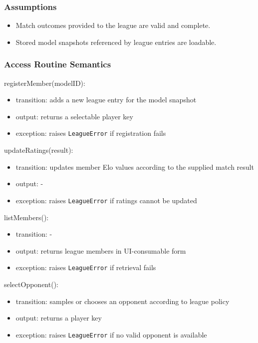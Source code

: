 \documentclass[12pt, titlepage]{article}
\begin{document}
\subsubsection{Assumptions}
\begin{itemize}
    \item Match outcomes provided to the league are valid and complete.
    \item Stored model snapshots referenced by league entries are loadable.
\end{itemize}

\subsubsection{Access Routine Semantics}

\noindent registerMember(modelID):
\begin{itemize}
\item transition: adds a new league entry for the model snapshot
\item output: returns a selectable player key
\item exception: raises \texttt{LeagueError} if registration fails
\end{itemize}

\noindent updateRatings(result):
\begin{itemize}
\item transition: updates member Elo values according to the supplied match result
\item output: -
\item exception: raises \texttt{LeagueError} if ratings cannot be updated
\end{itemize}

\noindent listMembers():
\begin{itemize}
\item transition: -
\item output: returns league members in UI-consumable form
\item exception: raises \texttt{LeagueError} if retrieval fails
\end{itemize}

\noindent selectOpponent():
\begin{itemize}
\item transition: samples or chooses an opponent according to league policy
\item output: returns a player key
\item exception: raises \texttt{LeagueError} if no valid opponent is available
\end{itemize}
\end{document}
